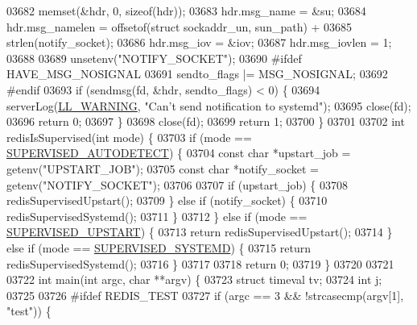 \begin{DoxyCode}
{{{{{{{{{{{{{{{{{{{{{{{{{{{{{{{{{{{{{{{{{{{{{{{{{{{{{{{{{{{{{{{{{{{{{{{{{{{{{{{{{{{{{{{{{{{{{{{{{{{{{{{{{{{{{{{{{{{{{{{{{{{{{{{{{{{{{{{{{{{{{{{{{{{{{{{{{{{{{{{{{{{{{{{{{{{{{{{{{{03682     memset(&hdr, 0, \textcolor{keyword}{sizeof}(hdr));
03683     hdr.msg\_name = &su;
03684     hdr.msg\_namelen = offsetof(\textcolor{keyword}{struct} sockaddr\_un, sun\_path) +
03685         strlen(notify\_socket);
03686     hdr.msg\_iov = &iov;
03687     hdr.msg\_iovlen = 1;
03688 
03689     unsetenv(\textcolor{stringliteral}{"NOTIFY\_SOCKET"});
03690 \textcolor{preprocessor}{#}\textcolor{preprocessor}{ifdef} HAVE\_MSG\_NOSIGNAL
03691     sendto\_flags |= MSG\_NOSIGNAL;
03692 \textcolor{preprocessor}{#}\textcolor{preprocessor}{endif}
03693     \textcolor{keywordflow}{if} (sendmsg(fd, &hdr, sendto\_flags) < 0) \{
03694         serverLog(\hyperlink{server_8h_a31229b9334bba7d6be2a72970967a14b}{LL\_WARNING}, \textcolor{stringliteral}{"Can't send notification to systemd"});
03695         close(fd);
03696         \textcolor{keywordflow}{return} 0;
03697     \}
03698     close(fd);
03699     \textcolor{keywordflow}{return} 1;
03700 \}
03701 
03702 \textcolor{keywordtype}{int} redisIsSupervised(\textcolor{keywordtype}{int} mode) \{
03703     \textcolor{keywordflow}{if} (mode == \hyperlink{server_8h_a7b2b1d1fd04a4f2c1a141e0976dd479b}{SUPERVISED\_AUTODETECT}) \{
03704         \textcolor{keyword}{const} \textcolor{keywordtype}{char} *upstart\_job = getenv(\textcolor{stringliteral}{"UPSTART\_JOB"});
03705         \textcolor{keyword}{const} \textcolor{keywordtype}{char} *notify\_socket = getenv(\textcolor{stringliteral}{"NOTIFY\_SOCKET"});
03706 
03707         \textcolor{keywordflow}{if} (upstart\_job) \{
03708             redisSupervisedUpstart();
03709         \} \textcolor{keywordflow}{else} \textcolor{keywordflow}{if} (notify\_socket) \{
03710             redisSupervisedSystemd();
03711         \}
03712     \} \textcolor{keywordflow}{else} \textcolor{keywordflow}{if} (mode == \hyperlink{server_8h_ae34bdafb8c6d3cc58fc6b319e623b604}{SUPERVISED\_UPSTART}) \{
03713         \textcolor{keywordflow}{return} redisSupervisedUpstart();
03714     \} \textcolor{keywordflow}{else} \textcolor{keywordflow}{if} (mode == \hyperlink{server_8h_aea7b4966d78f67f5ab89f38f0e1bde74}{SUPERVISED\_SYSTEMD}) \{
03715         \textcolor{keywordflow}{return} redisSupervisedSystemd();
03716     \}
03717 
03718     \textcolor{keywordflow}{return} 0;
03719 \}
03720 
03721 
03722 \textcolor{keywordtype}{int} main(\textcolor{keywordtype}{int} argc, \textcolor{keywordtype}{char} **argv) \{
03723     \textcolor{keyword}{struct} timeval tv;
03724     \textcolor{keywordtype}{int} j;
03725 
03726 \textcolor{preprocessor}{#}\textcolor{preprocessor}{ifdef} \textcolor{preprocessor}{REDIS\_TEST}
03727     \textcolor{keywordflow}{if} (argc == 3 && !strcasecmp(argv[1], \textcolor{stringliteral}{"test"})) \{
}}}}}}}}}}}}}}}}}}}}}}}}}}}}}}}}}}}}}}}}}}}}}}}}}}}}}}}}}}}}}}}}}}}}}}}}}}}}}}}}}}}}}}}}}}}}}}}}}}}}}}}}}}}}}}}}}}}}}}}}}}}}}}}}}}}}}}}}}}}}}}}}}}}}}}}}}}}}}}}}}}}}}}}}}}}}}}}}}}
\end{DoxyCode}
